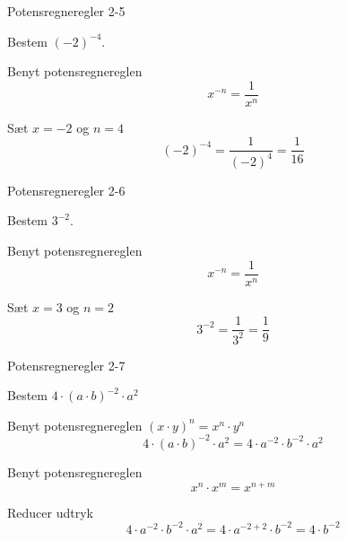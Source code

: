 \documentclass{article}
\begin{document}
\newpage

\begin{exercise}{Potensregneregler 2-5}
	
	Bestem $(-2)^{-4}$.
	
	
	\hint
	Benyt potensregnereglen 
	\[
	x^{-n} = \frac{1}{x^{n}} 
	\]
	
	\hint 
	
	Sæt $x=-2$ og $n=4$ 
	\[
	(-2)^{-4} = \frac{1}{(-2)^4} = \frac{1}{16}
	\]
	
\end{exercise}

\newpage

\begin{exercise}{Potensregneregler 2-6}
	
	Bestem $3^{-2}$.
	
	
	\hint
	Benyt potensregnereglen 
	\[
	x^{-n} = \frac{1}{x^{n}} 
	\]
	
	\hint 
	
	Sæt $x=3$ og $n=2$ 
	\[
	3^{-2} = \frac{1}{3^2} = \frac{1}{9}
	\]
	
\end{exercise}

\newpage

\begin{exercise}{Potensregneregler 2-7}
	
	Bestem $4 \cdot (a \cdot b)^{-2} \cdot a^2$
		
	
	\hint
	
	Benyt potensregnereglen $(x \cdot y)^n = x^n \cdot y^n$
	\[
	4 \cdot (a \cdot b)^{-2} \cdot a^2 = 4 \cdot a^{-2} \cdot b^{-2} \cdot a^{2}
	\]
	
	\hint
	Benyt potensregnereglen 
	\[
	x^n \cdot x^m  = x^{n+m} 
	\]
	
	\hint 
	
	Reducer udtryk
	\[
	4 \cdot a^{-2} \cdot b^{-2} \cdot a^{2} = 4 \cdot a^{-2+2} \cdot b^{-2} = 4 \cdot b^{-2}
	\]
	
\end{exercise}

\newpage
\end{document}
